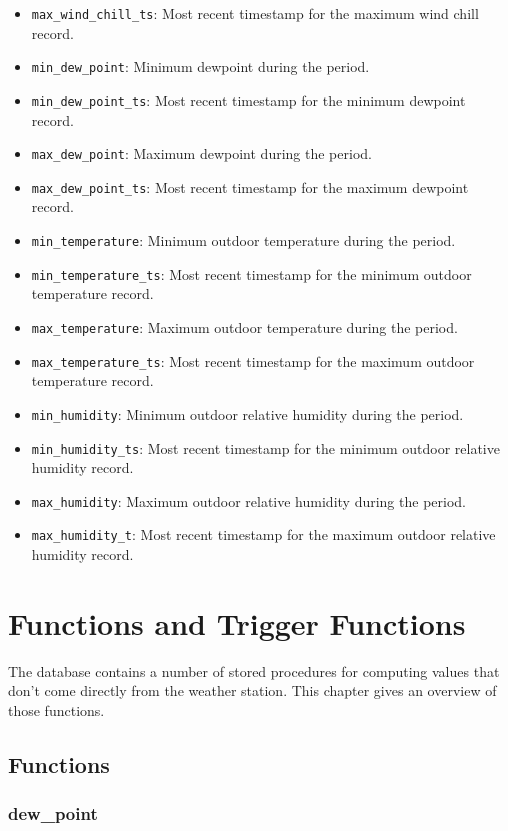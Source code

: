 \documentclass[a4paper,10pt]{book}
\begin{document}
\begin{itemize}
\item \verb|max_wind_chill_ts|: Most recent timestamp for the maximum wind chill record.
\item \verb|min_dew_point|: Minimum dewpoint during the period.
\item \verb|min_dew_point_ts|: Most recent timestamp for the minimum dewpoint record.
\item \verb|max_dew_point|: Maximum dewpoint during the period.
\item \verb|max_dew_point_ts|: Most recent timestamp for the maximum dewpoint record.
\item \verb|min_temperature|: Minimum outdoor temperature during the period.
\item \verb|min_temperature_ts|: Most recent timestamp for the minimum outdoor temperature record.
\item \verb|max_temperature|: Maximum outdoor temperature during the period.
\item \verb|max_temperature_ts|: Most recent timestamp for the maximum outdoor temperature record.
\item \verb|min_humidity|: Minimum outdoor relative humidity during the period.
\item \verb|min_humidity_ts|: Most recent timestamp for the minimum outdoor relative humidity record.
\item \verb|max_humidity|: Maximum outdoor relative humidity during the period.
\item \verb|max_humidity_t|: Most recent timestamp for the maximum outdoor relative humidity record.
\end{itemize}

\chapter{Functions and Trigger Functions}
\label{cha_functions}

The database contains a number of stored procedures for computing values that don't come directly from the weather station. This chapter gives an overview of those functions.

\section{Functions}
\label{functions}
\subsection{dew\_point}
\label{dew_point}
\end{document}
